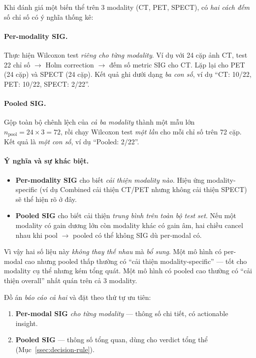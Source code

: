 Khi đánh giá một biến thể trên 3 modality (CT, PET, SPECT), có \emph{hai cách đếm} số chỉ số có ý nghĩa thống kê:

\paragraph{Per-modality SIG.}
Thực hiện Wilcoxon test \emph{riêng cho từng modality}. Ví dụ với 24 cặp ảnh CT, test 22 chỉ số $\to$ Holm correction $\to$ đếm số metric SIG cho CT. Lặp lại cho PET (24 cặp) và SPECT (24 cặp). Kết quả ghi dưới dạng \emph{ba con số}, ví dụ ``CT: 10/22, PET: 10/22, SPECT: 2/22''.

\paragraph{Pooled SIG.}
Gộp toàn bộ chênh lệch của \emph{cả ba modality} thành một mẫu lớn $n_{\mathrm{pool}} = 24 \times 3 = 72$, rồi chạy Wilcoxon test \emph{một lần} cho mỗi chỉ số trên 72 cặp. Kết quả là \emph{một con số}, ví dụ ``Pooled: 2/22''.

\paragraph{Ý nghĩa và sự khác biệt.}
\begin{itemize}\itemsep0pt
    \item \textbf{Per-modality SIG} cho biết \emph{cải thiện modality nào}. Hiệu ứng modality-specific (ví dụ Combined cải thiện CT/PET nhưng không cải thiện SPECT) sẽ thể hiện rõ ở đây.
    \item \textbf{Pooled SIG} cho biết cải thiện \emph{trung bình trên toàn bộ test set}. Nếu một modality có gain dương lớn còn modality khác có gain âm, hai chiều cancel nhau khi pool $\to$ pooled có thể không SIG dù per-modal có.
\end{itemize}

Vì vậy hai số liệu này \emph{không thay thế nhau} mà \emph{bổ sung}. Một mô hình có per-modal cao nhưng pooled thấp thường có ``cải thiện modality-specific'' --- tốt cho modality cụ thể nhưng kém tổng quát. Một mô hình có pooled cao thường có ``cải thiện overall'' nhất quán trên cả 3 modality.

Đồ án \emph{báo cáo cả hai} và đặt theo thứ tự ưu tiên:
\begin{enumerate}\itemsep0pt
    \item \textbf{Per-modal SIG} \emph{cho từng modality} --- thông số chi tiết, có actionable insight.
    \item \textbf{Pooled SIG} --- thông số tổng quan, dùng cho verdict tổng thể (Mục~\ref{ssec:decision-rule}).
\end{enumerate}

